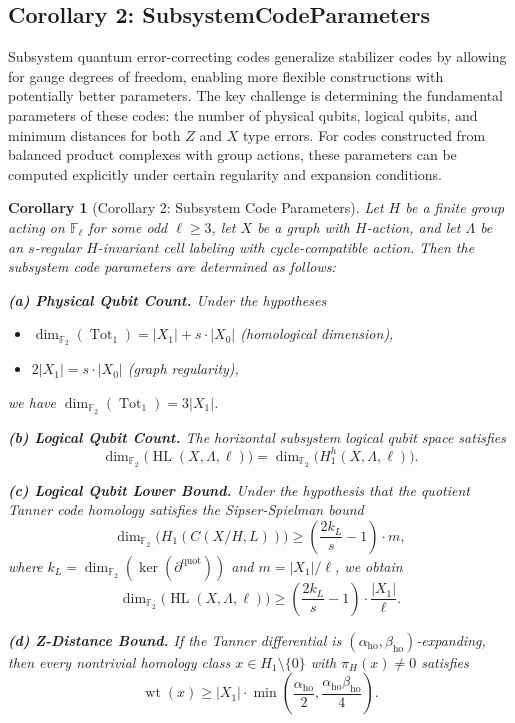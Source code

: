 \documentclass[11pt]{article}
\theoremstyle{plain}
\newtheorem*{corollary}{Corollary}
\theoremstyle{definition}
\theoremstyle{remark}
\renewcommand{\ker}{\operatorname{ker}}
\begin{document}
\subsection{Corollary 2: SubsystemCodeParameters}

Subsystem quantum error-correcting codes generalize stabilizer codes by allowing for gauge degrees of freedom, enabling more flexible constructions with potentially better parameters. The key challenge is determining the fundamental parameters of these codes: the number of physical qubits, logical qubits, and minimum distances for both $Z$ and $X$ type errors. For codes constructed from balanced product complexes with group actions, these parameters can be computed explicitly under certain regularity and expansion conditions.

\begin{corollary}[Corollary 2: Subsystem Code Parameters]
Let $H$ be a finite group acting on $\mathbb{F}_\ell$ for some odd $\ell \geq 3$, let $X$ be a graph with $H$-action, and let $\Lambda$ be an $s$-regular $H$-invariant cell labeling with cycle-compatible action. Then the subsystem code parameters are determined as follows:

\textbf{(a) Physical Qubit Count.} Under the hypotheses
\begin{itemize}
\item $\dim_{\mathbb{F}_2}(\operatorname{Tot}_1) = |X_1| + s \cdot |X_0|$ (homological dimension),
\item $2|X_1| = s \cdot |X_0|$ (graph regularity),
\end{itemize}
we have $\dim_{\mathbb{F}_2}(\operatorname{Tot}_1) = 3|X_1|$.

\textbf{(b) Logical Qubit Count.} The horizontal subsystem logical qubit space satisfies
\[
\dim_{\mathbb{F}_2}\bigl(\operatorname{HL}(X, \Lambda, \ell)\bigr) = \dim_{\mathbb{F}_2}\bigl(H_1^h(X, \Lambda, \ell)\bigr).
\]

\textbf{(c) Logical Qubit Lower Bound.} Under the hypothesis that the quotient Tanner code homology satisfies the Sipser-Spielman bound
\[
\dim_{\mathbb{F}_2}\bigl(H_1(C(X/H, L))\bigr) \geq \left(\frac{2k_L}{s} - 1\right) \cdot m,
\]
where $k_L = \dim_{\mathbb{F}_2}(\ker(\partial^{\mathrm{quot}}))$ and $m = |X_1|/\ell$, we obtain
\[
\dim_{\mathbb{F}_2}\bigl(\operatorname{HL}(X, \Lambda, \ell)\bigr) \geq \left(\frac{2k_L}{s} - 1\right) \cdot \frac{|X_1|}{\ell}.
\]

\textbf{(d) Z-Distance Bound.} If the Tanner differential is $(\alpha_{\mathrm{ho}}, \beta_{\mathrm{ho}})$-expanding, then every nontrivial homology class $x \in H_1 \setminus \{0\}$ with $\pi_H(x) \neq 0$ satisfies
\[
\operatorname{wt}(x) \geq |X_1| \cdot \min\left(\frac{\alpha_{\mathrm{ho}}}{2}, \frac{\alpha_{\mathrm{ho}} \beta_{\mathrm{ho}}}{4}\right).
\]


\end{corollary}
\end{document}

